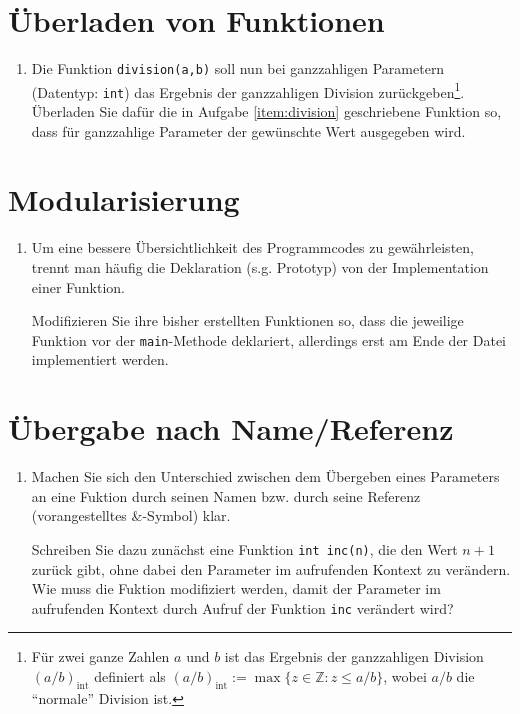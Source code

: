 \documentclass[paper=a4, fontsize=11pt, twoside]{scrartcl}
\begin{document}
\section*{Überladen von Funktionen}\label{sec:uberl-von-funktionen}
\begin{enumerate}[resume]
\item Die Funktion \texttt{division(a,b)} soll nun bei ganzzahligen Parametern (Datentyp: \texttt{int}) das Ergebnis der ganzzahligen Division zurückgeben\footnote{Für zwei ganze Zahlen $a$ und $b$ ist das Ergebnis der ganzzahligen Division $(a/b)_{\mathrm{int}}$ definiert als $(a/b)_{\mathrm{int}}:= \max\{z \in \mathbb{Z}:z\le a/b \}$, wobei $a/b$ die ``normale'' Division ist.}. Überladen Sie dafür die in Aufgabe \ref{item:division} geschriebene Funktion so, dass für ganzzahlige Parameter der gewünschte Wert ausgegeben wird. 
\end{enumerate}

\section*{Modularisierung}\label{sec:modularisierung}
\begin{enumerate}[resume]
\item Um eine bessere Übersichtlichkeit des Programmcodes zu gewährleisten, trennt man häufig die Deklaration (s.g. Prototyp) von der Implementation einer Funktion. \par
Modifizieren Sie ihre bisher erstellten Funktionen so, dass die jeweilige Funktion vor der \texttt{main}-Methode deklariert, allerdings erst am Ende der Datei implementiert werden.
\end{enumerate}

\section*{Übergabe nach Name/Referenz}
\begin{enumerate}[resume]
\item Machen Sie sich den Unterschied zwischen dem Übergeben eines Parameters an eine Fuktion durch seinen Namen bzw. durch seine Referenz (vorangestelltes \textrm{\&}-Symbol) klar. \par
  Schreiben Sie dazu zunächst eine Funktion \texttt{int inc(n)}, die den Wert $n+1$ zurück gibt, ohne dabei den Parameter im aufrufenden Kontext zu verändern. \\
  Wie muss die Fuktion modifiziert werden, damit der Parameter im aufrufenden Kontext durch Aufruf der Funktion \texttt{inc} verändert wird? 
\end{enumerate}
\end{document}
